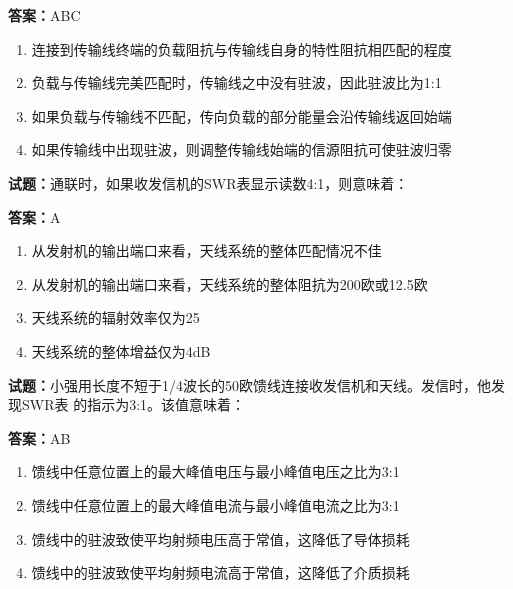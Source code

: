 \documentclass{ctexbook}
\begin{document}
\textbf{答案：}ABC 

\begin{enumerate}[leftmargin=3em]
  \item 连接到传输线终端的负载阻抗与传输线自身的特性阻抗相匹配的程度 

  \item 负载与传输线完美匹配时，传输线之中没有驻波，因此驻波比为1:1 

  \item 如果负载与传输线不匹配，传向负载的部分能量会沿传输线返回始端 

  \item 如果传输线中出现驻波，则调整传输线始端的信源阻抗可使驻波归零 

\end{enumerate}





\vspace{1em}

\textbf{试题：}通联时，如果收发信机的SWR表显示读数4:1，则意味着： 

\textbf{答案：}A 

\begin{enumerate}[leftmargin=3em]
  \item 从发射机的输出端口来看，天线系统的整体匹配情况不佳 

  \item 从发射机的输出端口来看，天线系统的整体阻抗为200欧或12.5欧 

  \item 天线系统的辐射效率仅为25%

  \item 天线系统的整体增益仅为4dB 

\end{enumerate}





\vspace{1em}

\textbf{试题：}小强用长度不短于1/4波长的50欧馈线连接收发信机和天线。发信时，他发现SWR表
的指示为3:1。该值意味着： 

\textbf{答案：}AB 

\begin{enumerate}[leftmargin=3em]
  \item 馈线中任意位置上的最大峰值电压与最小峰值电压之比为3:1 

  \item 馈线中任意位置上的最大峰值电流与最小峰值电流之比为3:1 


  \item 馈线中的驻波致使平均射频电压高于常值，这降低了导体损耗 

  \item 馈线中的驻波致使平均射频电流高于常值，这降低了介质损耗 

\end{enumerate}
\end{document}
